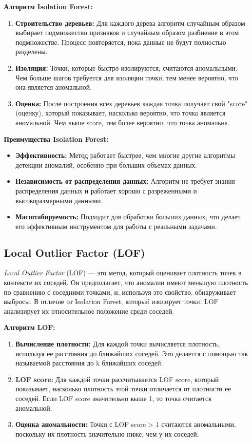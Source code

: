 \textbf{Алгоритм Isolation Forest:}
\begin{enumerate}
    \item \textbf{Строительство деревьев:} Для каждого дерева алгоритм случайным образом выбирает подмножество признаков и случайным образом разбиение в этом подмножестве. Процесс повторяется, пока данные не будут полностью разделены.
    \item \textbf{Изоляция:} Точки, которые быстро изолируются, считаются аномальными. Чем больше шагов требуется для изоляции точки, тем менее вероятно, что она является аномальной.
    \item \textbf{Оценка:} После построения всех деревьев каждая точка получает свой "score" (оценку), который показывает, насколько вероятно, что точка является аномальной. Чем выше score, тем более вероятно, что точка аномальна.
\end{enumerate}

\textbf{Преимущества Isolation Forest:}
\begin{itemize}
    \item \textbf{Эффективность:} Метод работает быстрее, чем многие другие алгоритмы детекции аномалий, особенно при больших объемах данных.
    \item \textbf{Независимость от распределения данных:} Алгоритм не требует знания распределения данных и работает хорошо с разреженными и высокоразмерными данными.
    \item \textbf{Масштабируемость:} Подходит для обработки больших данных, что делает его эффективным инструментом для работы с реальными задачами.
\end{itemize}

\subsection{Local Outlier Factor (LOF)}
\textit{Local Outlier Factor} (LOF) — это метод, который оценивает плотность точек в контексте их соседей. Он предполагает, что аномалии имеют меньшую плотность по сравнению с соседними точками, и, используя это свойство, обнаруживает выбросы. В отличие от Isolation Forest, который изолирует точки, LOF анализирует их относительное положение среди соседей.

\textbf{Алгоритм LOF:}
\begin{enumerate}
    \item \textbf{Вычисление плотности:} Для каждой точки вычисляется плотность, используя ее расстояния до ближайших соседей. Это делается с помощью так называемой расстояния до k ближайших соседей.
    \item \textbf{LOF score:} Для каждой точки рассчитывается LOF score, который показывает, насколько плотность этой точки отличается от плотности ее соседей. Если LOF score значительно выше 1, то точка считается аномальной.
    \item \textbf{Оценка аномальности:} Точки с LOF score > 1 считаются аномальными, поскольку их плотность значительно ниже, чем у их соседей.
\end{enumerate}


